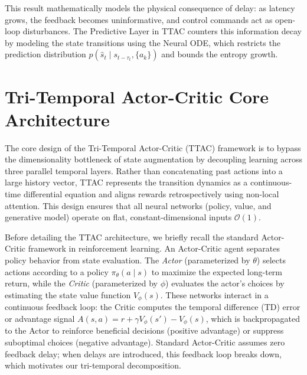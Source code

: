 \documentclass[manuscript, screen, review]{jair}
\begin{document}
This result mathematically models the physical consequence of delay: as latency grows, the feedback becomes uninformative, and control commands act as open-loop disturbances. The Predictive Layer in TTAC counters this information decay by modeling the state transitions using the Neural ODE, which restricts the prediction distribution $p(\hat{s}_t \mid s_{t-\tau_t}, \{a_{k}\})$ and bounds the entropy growth.

\section{Tri-Temporal Actor-Critic Core Architecture}\label{sec:architecture}
The core design of the Tri-Temporal Actor-Critic (TTAC) framework is to bypass the dimensionality bottleneck of state augmentation by decoupling learning across three parallel temporal layers. Rather than concatenating past actions into a large history vector, TTAC represents the transition dynamics as a continuous-time differential equation and aligns rewards retrospectively using non-local attention. This design ensures that all neural networks (policy, value, and generative model) operate on flat, constant-dimensional inputs $\mathcal{O}(1)$.

Before detailing the TTAC architecture, we briefly recall the standard Actor-Critic framework in reinforcement learning. An Actor-Critic agent separates policy behavior from state evaluation. The \textit{Actor} (parameterized by $\theta$) selects actions according to a policy $\pi_\theta(a \mid s)$ to maximize the expected long-term return, while the \textit{Critic} (parameterized by $\phi$) evaluates the actor's choices by estimating the state value function $V_\phi(s)$. These networks interact in a continuous feedback loop: the Critic computes the temporal difference (TD) error or advantage signal $A(s, a) = r + \gamma V_\phi(s') - V_\phi(s)$, which is backpropagated to the Actor to reinforce beneficial decisions (positive advantage) or suppress suboptimal choices (negative advantage). Standard Actor-Critic assumes zero feedback delay; when delays are introduced, this feedback loop breaks down, which motivates our tri-temporal decomposition.
\end{document}

